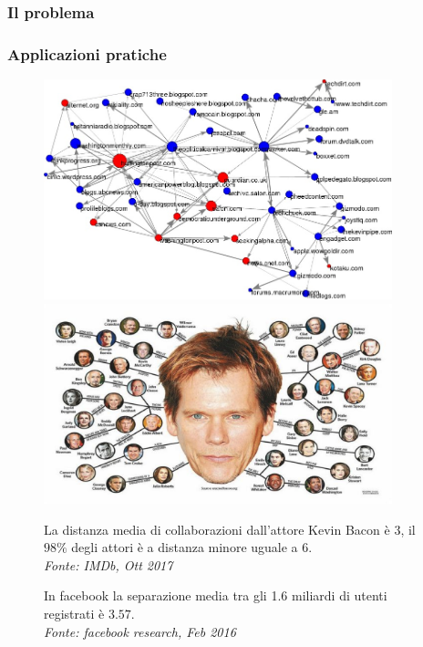 \begin{frame}
	\frametitle{Il problema}
	\centering
\end{frame}

\begin{frame}
	\frametitle{Applicazioni pratiche}
	\centering
	\begin{figure}[h]
		\centering
		\begin{minipage}[t]{.49\textwidth}
			\centering
			\includegraphics[width=0.9\textwidth]{images/4_netinf}
			\caption{In facebook la separazione media tra gli 1.6 miliardi di utenti registrati è $3.57$.\\ \textit{Fonte: facebook research, Feb 2016}}
		\end{minipage}\hfill
		\begin{minipage}[t]{.49\textwidth}
			\centering
			\includegraphics[width=0.9\textwidth]{images/2_kevin_bacon}
			
			La distanza media di collaborazioni dall'attore Kevin Bacon è $3$, il $98\%$ degli attori è a distanza minore uguale a $6$.\\ \textit{Fonte: IMDb, Ott 2017}
		\end{minipage}
	\end{figure}
\end{frame}
